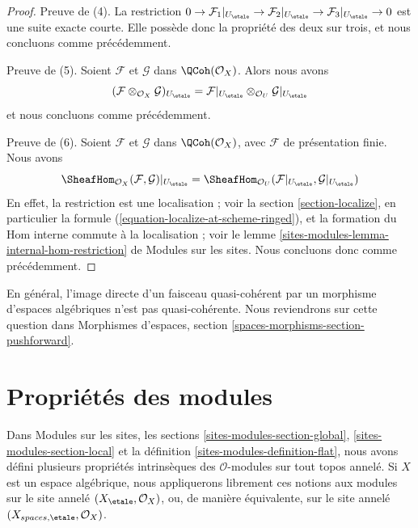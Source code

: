 \begin{proof}
\medskip\noindent
Preuve de (4). La restriction
$0 \to \mathcal{F}_1|_{U_\etale} \to \mathcal{F}_2|_{U_\etale}
\to \mathcal{F}_3|_{U_\etale} \to 0$
est une suite exacte courte. Elle possède donc la propriété des deux sur trois,
et nous concluons comme précédemment.

\medskip\noindent
Preuve de (5). Soient $\mathcal{F}$ et $\mathcal{G}$ dans $\QCoh(\mathcal{O}_X)$.
Alors nous avons
$$
(\mathcal{F} \otimes_{\mathcal{O}_X} \mathcal{G})_{U_\etale} =
\mathcal{F}|_{U_\etale} \otimes_{\mathcal{O}_U} \mathcal{G}|_{U_\etale}
$$
et nous concluons comme précédemment.

\medskip\noindent
Preuve de (6). Soient $\mathcal{F}$ et $\mathcal{G}$
dans $\QCoh(\mathcal{O}_X)$, avec $\mathcal{F}$
de présentation finie. Nous avons
$$
\SheafHom_{\mathcal{O}_X}(\mathcal{F}, \mathcal{G})|_{U_\etale} =
\SheafHom_{\mathcal{O}_U}(\mathcal{F}|_{U_\etale}, \mathcal{G}|_{U_\etale})
$$
En effet, la restriction est une localisation ; voir la
section \ref{section-localize}, en particulier la formule
(\ref{equation-localize-at-scheme-ringed}), et la formation du Hom
interne commute à la localisation ; voir le
lemme \ref{sites-modules-lemma-internal-hom-restriction} de Modules sur les sites.
Nous concluons donc comme précédemment.
\end{proof}

\noindent
En général, l'image directe d'un faisceau quasi-cohérent
par un morphisme d'espaces algébriques n'est pas quasi-cohérente. Nous reviendrons sur cette
question dans
Morphismes d'espaces, section \ref{spaces-morphisms-section-pushforward}.




\section{Propriétés des modules}
\label{section-properties-modules}

\noindent
Dans
Modules sur les sites, les sections
\ref{sites-modules-section-global},
\ref{sites-modules-section-local} et la
définition \ref{sites-modules-definition-flat},
nous avons défini plusieurs propriétés intrinsèques des
$\mathcal{O}$-modules sur tout topos annelé. Si $X$ est un espace
algébrique, nous appliquerons librement ces notions aux modules sur le site
annelé $(X_\etale, \mathcal{O}_X)$, ou, de manière équivalente, sur le site annelé
$(X_{spaces, \etale}, \mathcal{O}_X)$.

